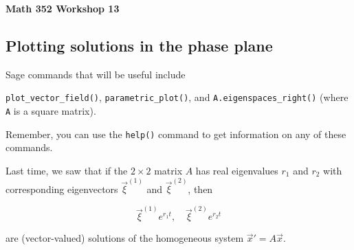 \documentclass[12pt,twoside]{exam}
\begin{document}
\noindent
\textbf{{\large Math 352 \hfill Workshop 13}}

\vspace{2ex}

\noindent
{}

\noindent

\newcommand{\longlines}{\setlength{\answerlinelength}{0.7\linewidth}}
\newcommand{\medlines}{\setlength{\answerlinelength}{0.45\linewidth}}
\newcommand{\shortlines}{\setlength{\answerlinelength}{0.2\linewidth}}

\RenewDocumentCommand{}

\subsection*{Plotting solutions in the phase plane}

Sage commands that will be useful include

\texttt{plot\_vector\_field()}, \texttt{parametric\_plot()}, and
\texttt{A.eigenspaces\_right()} (where \texttt{A} is a square matrix).

Remember, you can use the \texttt{help()} command to get information on
any of these commands.

Last time, we saw that if the $2 \times 2$ matrix $A$ has real
eigenvalues $r_1$ and $r_2$ with corresponding eigenvectors
$\vec{\xi}^{(1)}$ and $\vec{\xi}^{(2)}$, then

\begin{equation*}
    \vec{\xi}^{(1)} e^{r_1 t}, \quad \vec{\xi}^{(2)} e^{r_2 t}
\end{equation*}

are (vector-valued) solutions of the homogeneous system
$\vec{x}' = A\vec{x}$.
\end{document}
